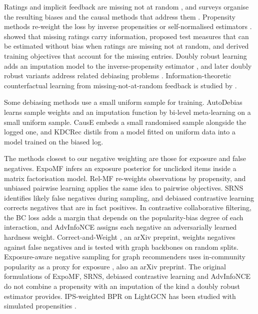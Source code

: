 Ratings and implicit feedback are missing not at random \citep{marlin2009collaborative}, and
surveys organise the resulting biases and the causal methods that address them
\citep{chen2023bias,gao2024causalsurvey}. Propensity methods re-weight the loss by inverse
propensities or self-normalised estimators \citep{schnabel2016,swaminathan2015snips,saito2020unbiased}.
\citet{steck2010mnar} showed that missing ratings carry information, proposed test measures
that can be estimated without bias when ratings are missing not at random, and derived training
objectives that account for the missing entries. Doubly robust learning adds an imputation model
to the inverse-propensity estimator \citep{wang2019drjl}, and later doubly robust variants
address related debiasing problems \citep{guo2021mrdr,dai2022gdr,li2023stabledr}. Information-theoretic counterfactual
learning from missing-not-at-random feedback is studied by \citet{wang2020cvib}.

Some debiasing methods use a small uniform sample for training. AutoDebias
\citep{chen2021autodebias} learns sample weights and an imputation function by bi-level
meta-learning on a small uniform sample. CausE \citep{bonner2018cause} embeds a small randomised
sample alongside the logged one, and KDCRec \citep{liu2020kdcrec} distils from a model fitted on
uniform data into a model trained on the biased log.

The methods closest to our negative weighting are those for exposure and false negatives. ExpoMF
\citep{liang2016exposure} infers an exposure posterior for unclicked items inside a matrix
factorisation model. Rel-MF \citep{saito2020unbiased} re-weights observations by propensity, and
unbiased pairwise learning \citep{saito2020ictir} applies the same idea to pairwise objectives.
SRNS \citep{ding2020srns} identifies likely false negatives during sampling, and debiased
contrastive learning \citep{chuang2020dcl} corrects negatives that are in fact positives. In
contrastive collaborative filtering, the BC loss \citep{zhang2022bc} adds a margin that depends
on the popularity-bias degree of each interaction, and AdvInfoNCE \citep{zhang2023advinfonce}
assigns each negative an adversarially learned hardness weight. Correct-and-Weight
\citep{yin2026cw}, an arXiv preprint, weights negatives against false negatives and is tested
with graph backbones on random splits. Exposure-aware negative sampling for graph recommenders
uses in-community popularity as a proxy for exposure \citep{chen2026icpns}, also an arXiv
preprint. The original formulations of ExpoMF, SRNS, debiased contrastive learning and
AdvInfoNCE do not combine a propensity with an imputation of the kind a doubly robust estimator
provides. IPS-weighted BPR on LightGCN has been studied with simulated propensities
\citep{raja2025ipsbpr}.

